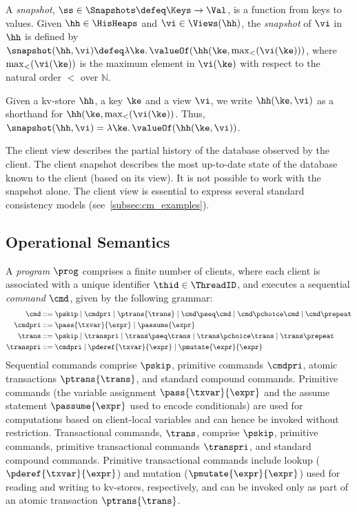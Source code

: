 \begin{definition}[Snapshots]
\label{def:heaps}
\label{def:snapshot}
A \emph{snapshot}, \( \ss \in \Snapshots  \defeq \Keys \to
\Val\),  is a function  from keys to values.
Given $\hh \in \HisHeaps$ and $\vi \in \Views(\hh)$, the \emph{snapshot} of $\vi$ in 
$\hh$ is defined by  $\snapshot(\hh, \vi) \defeq \lambda \ke \ldotp \valueOf(\hh(\ke, \max_{<}(\vi(\ke)))$, 
where $\max_{<}(\vi(\ke))$ is the maximum element in $\vi(\ke)$ with respect to the natural 
order $<$ over $\mathbb{N}$.
\end{definition}
Given a kv-store $\hh$, a key $\ke$ and a view $\vi$, 
we write 
$\hh(\ke, \vi)$ as a shorthand for 
$\hh(\ke, \max_{<}(\vi(\ke))$. Thus, $\snapshot(\hh, \vi) = \lambda \ke \ldotp \valueOf(\hh(\ke, \vi))$. 

\begin{remark}
The client view describes the partial history of the database observed by the client. 
The client snapshot describes the most up-to-date state of the database known to the client (based on its view). 
It is not possible to work with the snapshot alone. 
The client view is essential to express several standard consistency models (see~\cref{subsec:cm_examples}). 
\end{remark}


\subsection{Operational Semantics}

A \emph{program} \( \prog \) comprises a finite number of clients,
where each client is associated with a unique identifier \( \thid \in \ThreadID \), 
and executes a sequential \emph{command} $\cmd$, given by the following grammar:
\begin{align*}
\cmd & ::=  
\pskip \mid 
\cmdpri \mid  
\ptrans{\trans} \mid 
\cmd \pseq \cmd \mid 
\cmd \pchoice \cmd \mid 
\cmd \prepeat  
\\
\cmdpri & ::=  
\pass{\txvar}{\expr} \mid 
\passume{\expr} 
\\
\trans & ::=
\pskip \mid
\transpri \mid 
\trans \pseq \trans \mid
\trans \pchoice \trans \mid
\trans\prepeat    
\\
\transpri & ::= 
\cmdpri \mid
\pderef{\txvar}{\expr} \mid
\pmutate{\expr}{\expr} 
\end{align*} 
%
%
Sequential commands  comprise $\pskip$,  primitive commands $\cmdpri
$, atomic transactions
$\ptrans{\trans}$,  and standard
compound commands. 
Primitive commands (the variable assignment
$\pass{\txvar}{\expr}$ and the assume statement $\passume{\expr}$
used to encode conditionals) are used for computations based on 
client-local variables 
and can hence be invoked without restriction. 
Transactional commands, $\trans$, 
comprise $\pskip$, primitive commands, 
primitive transactional commands $\transpri$,  and standard compound commands. 
Primitive transactional commands include lookup ($\pderef{\txvar}{\expr}$) and mutation 
($\pmutate{\expr}{\expr}$) used for reading and writing to kv-stores, respectively, and  
can be invoked only as part of an atomic transaction $\ptrans{\trans}$.

